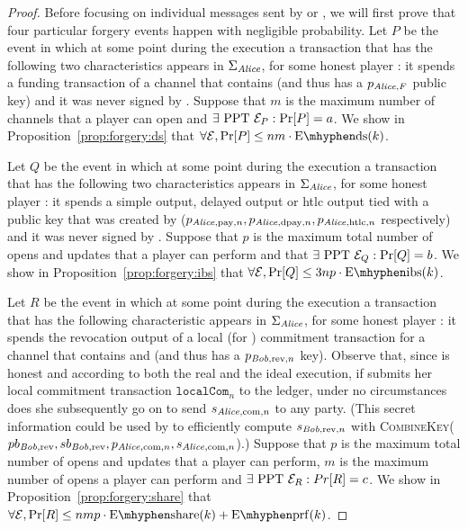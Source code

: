 \begin{proof}
  Before focusing on individual messages sent by \environment{} or \adversary,
  we will first prove that four particular forgery events happen with negligible
  probability. Let $P$ be the event in which at some point during the execution
  a transaction that has the following two characteristics appears in
  $\Sigma_{\mathit{Alice}}$, for some honest player \alice: it spends a funding
  transaction of a channel that contains \alice{} (and thus has a $p_{\mathit{Alice},
  F}$ public key) and it was never signed by \alice. Suppose that $m$ is the
  maximum number of channels that a player can open and $\exists \text{ PPT }
  \mathcal{E}_P: \Pr[P] = a$. We show in Proposition~\ref{prop:forgery:ds} that
  $\forall \environment, \Pr[P] \leq nm \cdot \mathrm{E \mhyphen ds}(k)$.

  Let $Q$ be the event in which at some point during the execution a transaction
  that has the following two characteristics appears in $\Sigma_{\mathit{Alice}}$, for
  some honest player \alice: it spends a simple output, delayed output or htlc
  output tied with a public key that was created by \alice{} ($p_{\mathit{Alice},
  \mathrm{pay}, n}, p_{\mathit{Alice}, \mathrm{dpay}, n}, p_{\mathit{Alice}, \mathrm{htlc}, n}$
  respectively) and it was never signed by \alice. Suppose that $p$ is the
  maximum total number of opens and updates that a player can perform and that
  $\exists \text{ PPT } \mathcal{E}_Q: \Pr[Q] = b$. We show
  in Proposition~\ref{prop:forgery:ibs} that $\forall \environment, \Pr[Q] \leq
  3np \cdot \mathrm{E \mhyphen ibs}(k)$.

  Let $R$ be the event in which at some point during the execution a transaction
  that has the following characteristic appears in $\Sigma_{\mathit{Alice}}$, for some
  honest player \alice: it spends the revocation output of a local (for
  \alice{}) commitment transaction for a channel that contains \alice{} and
  \bob{} (and thus has a $p_{\mathit{Bob}, \mathrm{rev}, n}$ key). Observe that, since
  \alice{} is honest and according to both the real and the ideal execution, if
  \alice{} submits her local commitment transaction $\mathtt{localCom}_n$ to the
  ledger, under no circumstances does she subsequently go on to send $s_{\mathit{Alice},
  \mathrm{com}, n}$ to any party. (This secret information could be used by
  \bob{} to efficiently compute $s_{\mathit{Bob}, \mathrm{rev}, n}$ with
  \textsc{CombineKey}($pb_{\mathit{Bob}, \mathrm{rev}}, sb_{\mathit{Bob}, \mathrm{rev}},
  p_{\mathit{Alice}, \mathrm{com}, n}, s_{\mathit{Alice}, \mathrm{com}, n}$).) Suppose that $p$
  is the maximum total number of opens and updates that a player can perform,
  $m$ is the maximum number of opens a player can perform and $\exists \text{
  PPT } \mathcal{E}_R: Pr[R] = c$. We show in
  Proposition~\ref{prop:forgery:share} that $\forall \environment, \Pr[R] \leq
  nmp \cdot \mathrm{E \mhyphen share}(k) + \mathrm{E \mhyphen prf}(k)$.


\end{proof}

